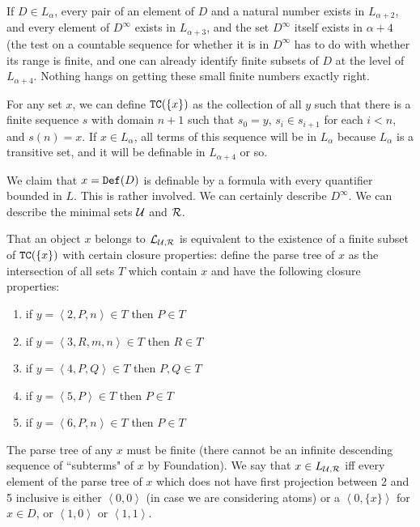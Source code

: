 \documentclass[12pt]{book}
\begin{document}
If $D \in L_{\alpha}$, every pair of an element of $D$ and a natural number exists in $L_{\alpha+2}$, and every element of $D^{\infty}$ exists in
$L_{\alpha+3}$, and the set $D^{\infty}$ itself exists in $\alpha+4$ (the test on a countable sequence for whether it is in $D^{\infty}$ has to do with whether its range is finite, and one can already identify finite subsets of $D$ at the level of $L_{\alpha+4}$.  Nothing hangs on getting these small finite numbers exactly right.

For any set $x$, we can define ${\tt TC}(\{x\})$ as the collection of all $y$ such that there is a finite sequence $s$ with domain $n+1$ such that $s_0=y$, $s_{i} \in s_{i+1}$ for each $i<n$, and $s(n)=x$.  If $x \in L_{\alpha}$, all terms of this sequence will be in $L_{\alpha}$ because $L_{\alpha}$ is a transitive set, and it will be definable in $L_{\alpha+4}$ or so.

We claim that $x = {\tt Def}(D)$ is definable by a formula with every quantifier bounded in $L$.  This is rather involved.  We can certainly describe $D^{\infty}$.  We can describe the minimal sets $\cal U$ and $\cal R$.  

That an object $x$ belongs to ${\cal L}_{\cal U,R}$ is equivalent to the existence of a finite subset of ${\tt TC}(\{x\})$ with certain closure properties:  define the parse tree of $x$ as the intersection of all sets $T$ which contain $x$ and have the following closure properties:

\begin{enumerate}

\item if $y=\left<2,P,n\right>\in T$ then $P \in T$

\item if $y = \left<3,R,m,n\right>\in T$ then $R \in T$

\item if $y = \left<4,P,Q\right>\in T$ then $P,Q \in T$

\item if $y = \left<5,P\right> \in T$ then $P \in T$

\item if $y= \left<6,P,n\right> \in T$ then $P \in T$

\end{enumerate}

The parse tree of any $x$ must be finite (there cannot be an infinite descending sequence of ``subterms" of $x$ by Foundation).
We say that $x \in L_{\cal U,R}$ iff every element of the parse tree of $x$ which does not have first projection between 2 and 5 inclusive
is either $\left<0,0\right>$ (in case we are considering atoms) or a $\left<0,\{x\}\right>$ for $x \in D$, or $\left<1,0\right>$ or $\left<1,1\right>$.
\end{document}
